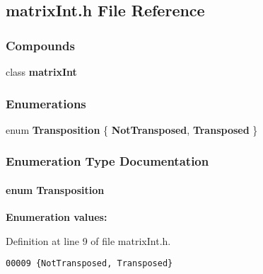 \subsection{matrix\-Int.h File Reference}
\label{matrixInt.h}
\subsubsection*{Compounds}
\begin{CompactItemize}
\item 
class {\bf matrix\-Int}
\end{CompactItemize}
\subsubsection*{Enumerations}
\begin{CompactItemize}
\item 
enum {\bf Transposition} \{ {\bf Not\-Transposed}, 
{\bf Transposed}
 \}
\end{CompactItemize}


\subsubsection{Enumeration Type Documentation}
\label{matrixInt.h_a2}
\paragraph{\setlength{\rightskip}{0pt plus 5cm}enum Transposition}\hfill

\begin{Desc}
\item[{\bf Enumeration values:}]\par
\begin{description}
\item[
\label{matrixInt.h_a0}
{\em Not\-Transposed}]\item[
\label{matrixInt.h_a1}
{\em Transposed}]\end{description}
\end{Desc}



Definition at line 9 of file matrix\-Int.h.\small\begin{verbatim}00009 {NotTransposed, Transposed}
\end{verbatim}\normalsize 
